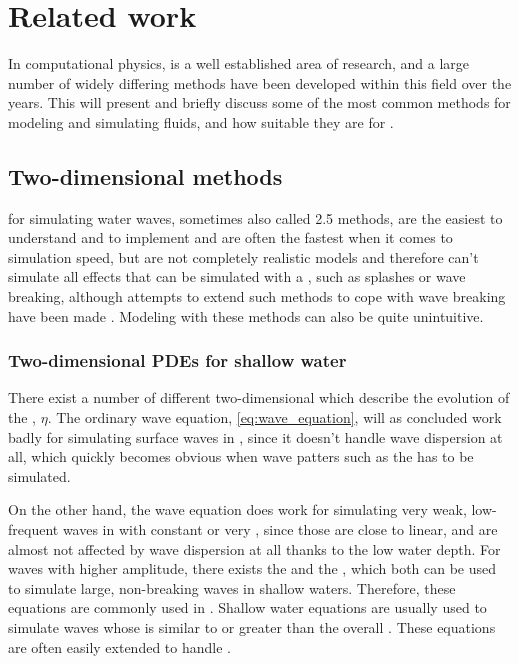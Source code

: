 \chapter{Related work}


In computational physics, \CFD is a well established area of research, and a large number of widely differing methods have been developed within this field over the years. This \levelname will present and briefly discuss some of the most common methods for modeling and simulating fluids, and how suitable they are for \thisprojectwork.

\section{Two-dimensional methods}

 for simulating water waves, sometimes also called 2.5 methods, are the easiest to understand and to implement and are often the fastest when it comes to simulation speed, but are not completely realistic models and therefore can't simulate all effects that can be simulated with a , such as splashes or wave breaking, although attempts to extend such methods to cope with wave breaking have been made \citep[e.g.][]{Miklos2009}. Modeling \FSI with these methods can also be quite unintuitive.

\subsection{Two-dimensional PDEs for shallow water}

There exist a number of different two-dimensional \PDEs which describe the evolution of the , $\eta$. The ordinary wave equation, \eqref{eq:wave_equation}, will as concluded work badly for simulating surface waves in , since it doesn't handle wave dispersion at all, which quickly becomes obvious when wave patters such as the  has to be simulated.

On the other hand, the wave equation does work for simulating very weak, low-frequent waves in  with constant or very , since those are close to linear, and are almost not affected by wave dispersion at all thanks to the low water depth. For waves with higher amplitude, there exists the  and the , which both can be used to simulate large, non-breaking waves in shallow waters. Therefore, these equations are commonly used in \SWS. Shallow water equations are usually used to simulate waves whose \wavelength is similar to or greater than the overall  \citep{Thurey2006}. These equations are often easily extended to handle \FSI.


